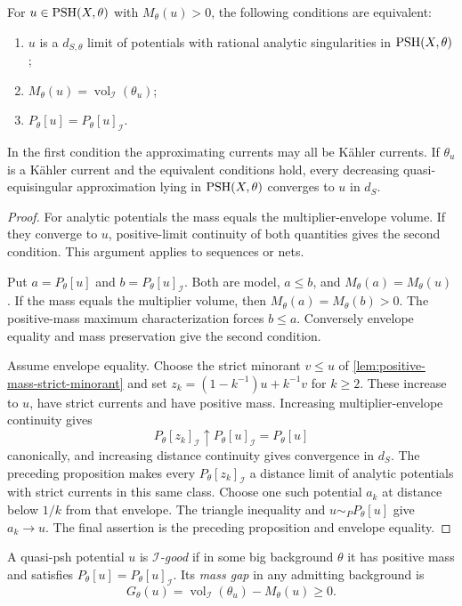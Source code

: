 \begin{theorem}\label{thm:i-good-analytic-closure-characterization}
For $u\in\mathrm{PSH}(X,\theta)$ with $M_\theta(u)>0$, the following conditions are equivalent:
\begin{enumerate}
 \item $u$ is a $d_{S,\theta}$ limit of potentials with rational analytic singularities in $\mathrm{PSH}(X,\theta)$;
 \item $M_\theta(u)=\operatorname{vol}_{\mathcal I}(\theta_u)$;
 \item $P_\theta[u]=P_\theta[u]_{\mathcal I}$.
\end{enumerate}
In the first condition the approximating currents may all be K\"ahler currents. If $\theta_u$ is a K\"ahler current and the equivalent conditions hold, every decreasing quasi-equisingular approximation lying in $\mathrm{PSH}(X,\theta)$ converges to $u$ in $d_S$.
\end{theorem}
\begin{proof}
For analytic potentials the mass equals the multiplier-envelope volume. If they converge to $u$, positive-limit continuity of both quantities gives the second condition. This argument applies to sequences or nets.

Put $a=P_\theta[u]$ and $b=P_\theta[u]_{\mathcal I}$. Both are model, $a\leq b$, and $M_\theta(a)=M_\theta(u)$. If the mass equals the multiplier volume, then $M_\theta(a)=M_\theta(b)>0$. The positive-mass maximum characterization forces $b\leq a$. Conversely envelope equality and mass preservation give the second condition.

Assume envelope equality. Choose the strict minorant $v\leq u$ of \cref{lem:positive-mass-strict-minorant} and set $z_k=(1-k^{-1})u+k^{-1}v$ for $k\geq2$. These increase to $u$, have strict currents and have positive mass. Increasing multiplier-envelope continuity gives
\[
 P_\theta[z_k]_{\mathcal I}\uparrow P_\theta[u]_{\mathcal I}=P_\theta[u]
\]
canonically, and increasing distance continuity gives convergence in $d_S$. The preceding proposition makes every $P_\theta[z_k]_{\mathcal I}$ a distance limit of analytic potentials with strict currents in this same class. Choose one such potential $a_k$ at distance below $1/k$ from that envelope. The triangle inequality and $u\sim_PP_\theta[u]$ give $a_k\to u$. The final assertion is the preceding proposition and envelope equality.
\end{proof}

\begin{definition}\label{def:i-good-singularity}
A quasi-psh potential $u$ is \emph{$\mathcal I$-good} if in some big background $\theta$ it has positive mass and satisfies $P_\theta[u]=P_\theta[u]_{\mathcal I}$. Its \emph{mass gap} in any admitting background is
\[
 G_\theta(u)=\operatorname{vol}_{\mathcal I}(\theta_u)-M_\theta(u)\geq0.
\]
\end{definition}

